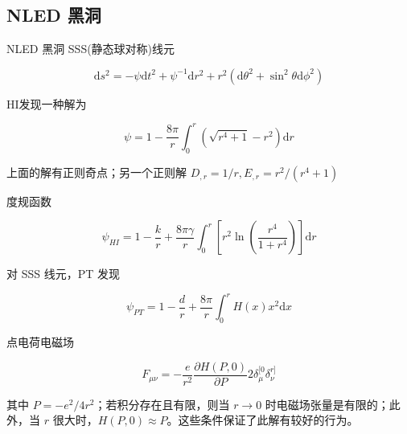 \documentclass[9pt, dvipsnames]{beamer} %
\begin{document}
\subsection{NLED 黑洞}

\begin{frame}{NLED 黑洞}
    SSS(静态球对称)线元

    $$
    \mathrm{d}s^2 = -\psi\mathrm{d}t^2 + \psi^{-1} \mathrm{d}r^2 + r^2\left(\mathrm{d}\theta^2+\sin^2\theta\mathrm{d}\phi^2 \right)
    $$
    
    HI发现一种解为
    
    $$
    \psi
    =1-\frac{8\pi }{r } \int_{0}^{r} \left(\sqrt{r^4+1} - r^2 \right)\mathrm{d}r
    $$
    
    上面的解有正则奇点；另一个正则解 $D_{,r}=1/r,E_{,r}=r^2/\left(r^4+1 \right) $
    
    度规函数
    
    $$
    \psi_{HI}
    =1-\frac{k }{r } + \frac{8\pi\gamma }{r } \int_{0}^{r} \left[r^2\ln\left(\frac{r^4 }{1+r^4 }  \right) \right] \mathrm{d}r
    $$

    
\end{frame}

\begin{frame}
    对 SSS 线元，PT 发现

    $$
    \psi_{PT}
    =1-\frac{d }{r } + \frac{8\pi }{r } \int_{0}^{r} H(x) x^2\mathrm{d}x
    $$

    点电荷电磁场

$$
F_{\mu\nu}
=-\frac{e }{r^2 } \frac{\partial H(P,0) }{\partial P } 2\delta_\mu^{[0}\delta_{\nu}^{r]}
$$

其中 $P=-e^2/4r^2$；若积分存在且有限，则当 $r\to 0$ 时电磁场张量是有限的；此外，当 $r$ 很大时，$H(P,0)\approx P$。这些条件保证了此解有较好的行为。

\end{frame}
\end{document}
